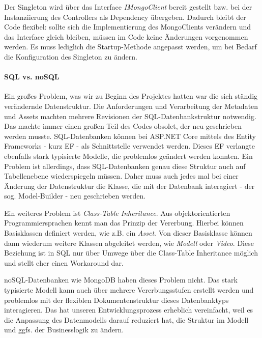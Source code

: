 \documentclass[titlepage, a4paper, 11pt]{scrartcl}
\begin{document}
        Der Singleton wird über das Interface \textit{IMongoClient} bereit gestellt bzw. bei der Instanziierung des Controllers als Dependency übergeben.
        Dadurch bleibt der Code flexibel: sollte sich die Implementierung des MongoClients verändern und das Interface gleich bleiben, müssen im Code keine Änderungen vorgenommen werden.
        Es muss lediglich die Startup-Methode angepasst werden, um bei Bedarf die Konfiguration des Singleton zu ändern.        

        \paragraph{SQL vs. noSQL}

          Ein großes Problem, was wir zu Beginn des Projektes hatten war die sich ständig verändernde Datenstruktur. Die Anforderungen und Verarbeitung der Metadaten und 
          Assets machten mehrere Revisionen der SQL-Datenbankstruktur notwendig. Das machte immer einen großen Teil des Codes obsolet, der neu geschrieben werden musste.
          SQL-Datenbanken können bei ASP.NET Core mittels des Entity Frameworks - kurz EF - als Schnittstelle verwendet werden. Dieses EF verlangte ebenfalls stark typisierte Modelle, 
          die problemlos geändert werden konnten. Ein Problem ist allerdings, dass SQL-Datenbanken genau diese Struktur auch auf Tabellenebene wiederspiegeln müssen.
          Daher muss auch jedes mal bei einer Änderung der Datenstruktur die Klasse, die mit der Datenbank interagiert - der sog. Model-Builder - neu geschrieben werden.
          
          Ein weiteres Problem ist \textit{Class-Table Inheritance}. Aus objektorientierten Programmiersprachen kennt man das Prinzip der Vererbung. 
          Hierbei können Basisklassen definiert werden, wie z.B. ein \textit{Asset}. Von dieser Basisklasse können dann wiederum weitere Klassen abgeleitet werden, 
          wie \textit{Modell} oder \textit{Video}. Diese Beziehung ist in SQL nur über Umwege über die Class-Table Inheritance möglich und stellt eher einen Workaround dar.

          noSQL-Datenbanken wie MongoDB haben dieses Problem nicht. Das stark typisierte Modell kann auch über mehrere Vererbungsstufen erstellt werden und problemlos
          mit der flexiblen Dokumentenstruktur dieses Datenbanktyps interagieren. Das hat unseren Entwicklungsprozess erheblich vereinfacht, weil es die Anpassung 
          des Datenmodells darauf reduziert hat, die Struktur im Modell und ggfs. der Businesslogik zu ändern.
\end{document}
